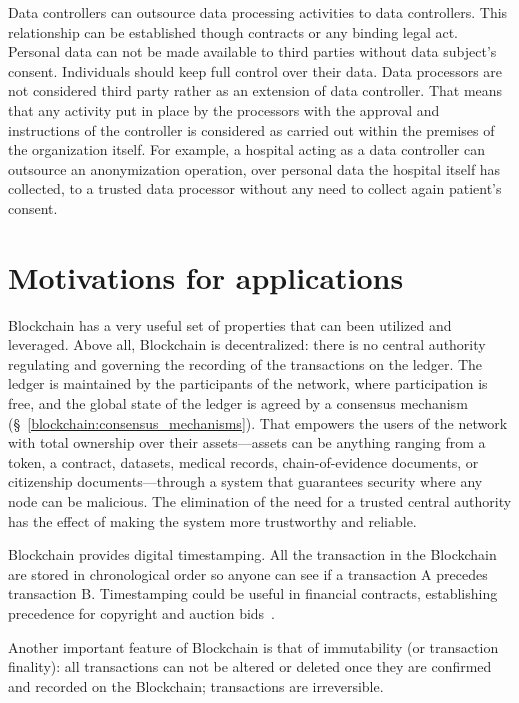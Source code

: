 Data controllers can outsource data processing activities to data controllers. This relationship can be established though contracts or any binding legal act. Personal data can not be made available to third parties without data subject's consent. Individuals should keep full control over their data. Data processors are not considered third party rather as an extension of data controller. That means that any activity put in place by the processors with the approval and instructions of the controller is considered as carried out within the premises of the organization itself. For example, a hospital acting as a data controller can outsource an anonymization operation, over personal data the hospital itself has collected, to a trusted data processor without any need to collect again patient's consent.

\section{Motivations for applications}\label{problem:motivations}

Blockchain has a very useful set of properties that can been utilized and leveraged. Above all, Blockchain is decentralized: there is no central authority regulating and governing the recording of the transactions on the ledger. The ledger is maintained by the participants of the network, where participation is free, and the global state of the ledger is agreed by a consensus mechanism (§~\ref{blockchain:consensus_mechanisms}). That empowers the users of the network with total ownership over their assets---assets can be anything ranging from a token, a contract, datasets, medical records, chain-of-evidence documents, or citizenship documents---through a system that guarantees security where any node can be malicious. The elimination of the need for a trusted central authority has the effect of making the system more trustworthy and reliable.

Blockchain provides digital timestamping. All the transaction in the Blockchain are stored in chronological order so anyone can see if a transaction A precedes transaction B. Timestamping could be useful in financial contracts, establishing precedence for copyright and auction bids~\cite{bl_auditability}.

Another important feature of Blockchain is that of immutability (or transaction finality): all transactions can not be altered or deleted once they are confirmed and recorded on the Blockchain; transactions are irreversible.

